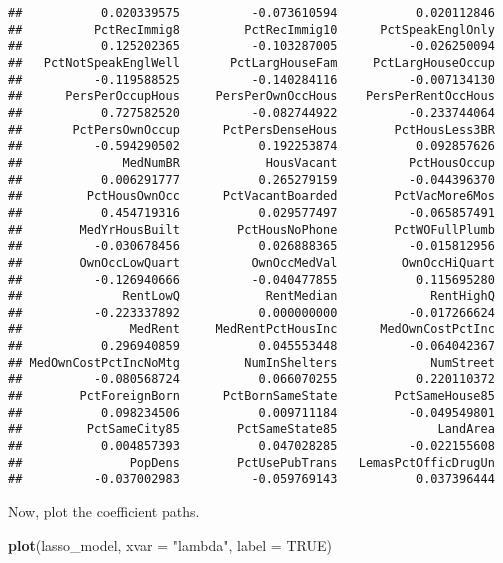 \documentclass[
]{article}
\newenvironment{Shaded}{\begin{snugshade}}{\end{snugshade}}
\newcommand{\AttributeTok}[1]{\textcolor[rgb]{0.13,0.29,0.53}{#1}}
\newcommand{\ConstantTok}[1]{\textcolor[rgb]{0.56,0.35,0.01}{#1}}
\newcommand{\FunctionTok}[1]{\textcolor[rgb]{0.13,0.29,0.53}{\textbf{#1}}}
\newcommand{\NormalTok}[1]{#1}
\newcommand{\StringTok}[1]{\textcolor[rgb]{0.31,0.60,0.02}{#1}}
\begin{document}
\begin{verbatim}
##           0.020339575          -0.073610594           0.020112846 
##          PctRecImmig8         PctRecImmig10      PctSpeakEnglOnly 
##           0.125202365          -0.103287005          -0.026250094 
##   PctNotSpeakEnglWell       PctLargHouseFam     PctLargHouseOccup 
##          -0.119588525          -0.140284116          -0.007134130 
##      PersPerOccupHous     PersPerOwnOccHous    PersPerRentOccHous 
##           0.727582520          -0.082744922          -0.233744064 
##       PctPersOwnOccup      PctPersDenseHous        PctHousLess3BR 
##          -0.594290502           0.192253874           0.092857626 
##              MedNumBR            HousVacant          PctHousOccup 
##           0.006291777           0.265279159          -0.044396370 
##         PctHousOwnOcc      PctVacantBoarded        PctVacMore6Mos 
##           0.454719316           0.029577497          -0.065857491 
##        MedYrHousBuilt        PctHousNoPhone        PctWOFullPlumb 
##          -0.030678456           0.026888365          -0.015812956 
##        OwnOccLowQuart          OwnOccMedVal         OwnOccHiQuart 
##          -0.126940666          -0.040477855           0.115695280 
##              RentLowQ            RentMedian             RentHighQ 
##          -0.223337892           0.000000000          -0.017266624 
##               MedRent     MedRentPctHousInc      MedOwnCostPctInc 
##           0.296940859           0.045553448          -0.064042367 
## MedOwnCostPctIncNoMtg         NumInShelters             NumStreet 
##          -0.080568724           0.066070255           0.220110372 
##        PctForeignBorn      PctBornSameState        PctSameHouse85 
##           0.098234506           0.009711184          -0.049549801 
##         PctSameCity85        PctSameState85              LandArea 
##           0.004857393           0.047028285          -0.022155608 
##               PopDens        PctUsePubTrans   LemasPctOfficDrugUn 
##          -0.037002983          -0.059769143           0.037396444
\end{verbatim}

Now, plot the coefficient paths.

\begin{Shaded}
\begin{Highlighting}[]
\FunctionTok{plot}\NormalTok{(lasso\_model, }\AttributeTok{xvar =} \StringTok{"lambda"}\NormalTok{, }\AttributeTok{label =} \ConstantTok{TRUE}\NormalTok{)}
\end{Highlighting}
\end{Shaded}
\end{document}
